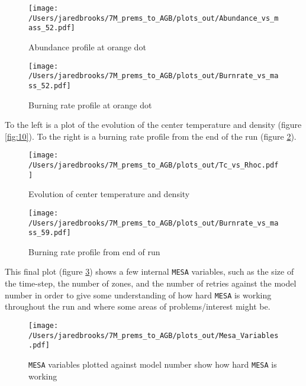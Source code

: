 \documentclass{article}
\begin{document}
        \begin{figure}[H]
          \begin{minipage}[b]{0.5\linewidth}
            \centering
            \texttt{[image: /Users/jaredbrooks/7M\_prems\_to\_AGB/plots\_out/Abundance\_vs\_mass\_52.pdf]}
            \caption{Abundance profile at orange dot}
            \label{fig:8}
          \end{minipage}
          \hspace{0cm}
          \begin{minipage}[b]{0.5\linewidth}
            \centering
            \texttt{[image: /Users/jaredbrooks/7M\_prems\_to\_AGB/plots\_out/Burnrate\_vs\_mass\_52.pdf]}
            \caption{Burning rate profile at orange dot}
            \label{fig:9}
          \end{minipage}
        \end{figure}

        \pagebreak

        To the left is a plot of the evolution of the center temperature and density (figure \ref{fig:10}).  To the right is a burning rate profile from the end of the run (figure \ref{fig:11}).

        \begin{figure}[H]
          \begin{minipage}[b]{0.5\linewidth}
            \centering
            \texttt{[image: /Users/jaredbrooks/7M\_prems\_to\_AGB/plots\_out/Tc\_vs\_Rhoc.pdf]}
            \caption{Evolution of center temperature and density}
            \label{fig:10}
          \end{minipage}
          \hspace{0cm}
          \begin{minipage}[b]{0.5\linewidth}
            \centering
            \texttt{[image: /Users/jaredbrooks/7M\_prems\_to\_AGB/plots\_out/Burnrate\_vs\_mass\_59.pdf]}
            \caption{Burning rate profile from end of run}
            \label{fig:11}
          \end{minipage}
        \end{figure}

        \pagebreak

        This final plot (figure \ref{fig:12}) shows a few internal \texttt{MESA} variables, such as the size of the time-step, the number of zones, and the number of retries against the model number in order to give some understanding of how hard \texttt{MESA} is working throughout the run and where some areas of problems/interest might be.

        \begin{figure}[H]
          \centering
          \texttt{[image: /Users/jaredbrooks/7M\_prems\_to\_AGB/plots\_out/Mesa\_Variables.pdf]}
          \caption{\texttt{MESA} variables plotted against model number show how hard \texttt{MESA} is working}
          \label{fig:12}
        \end{figure}
\end{document}
